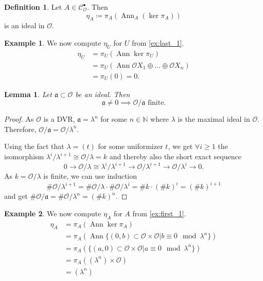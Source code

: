 \documentclass{article}
\theoremstyle{plain}%
\newtheorem{lemma}{Lemma}[section]
\theoremstyle{definition}
\newtheorem{definition}{Definition}[section]
\newtheorem{example}{Example}[section]
\theoremstyle{remark}
\newcommand{\cob}{\mathcal{C}_\mathcal{O}^\bullet}
\newcommand{\ann}{\operatorname{Ann}}
\begin{document}
    \begin{definition}
        Let \(A \in \cob\). Then
        \[\eta_A \coloneqq \pi_A(\ann_A (\ker \pi_A))\] is an ideal in \(\mathcal{O}\).
    \end{definition}

    \begin{example}
        We now compute \(\eta_U\) for \(U\) from \cref{ex:last_1}.
        \begin{align*}
            \eta_U &= \pi_U(\ann \ker \pi_U)\\
            &= \pi_U(\ann \mathcal{O}X_1 \oplus \dots \oplus \mathcal{O}X_n)\\
            &= \pi_U(0) = 0.
        \end{align*}
    \end{example}

    \begin{lemma}\label{lem:ideals}
        Let \(\mathfrak a \subset \mathcal{O}\) be an ideal. Then
        \[\mathfrak a \neq 0 \implies \mathcal{O}/\mathfrak a \text{ finite}.\]
    \end{lemma}
    \begin{proof}
        As \(\mathcal{O}\) is a DVR, \(\mathfrak a = \lambda^n\) for some \(n \in \mathbb N\) 
        where \(\lambda\) is the maximal ideal in \(\mathcal{O}\).
        Therefore, \(\mathcal{O}/\mathfrak{a} = \mathcal{O}/\lambda^n.\)

        Using the fact that \(\lambda = (t)\) for some uniformizer \(t\), we get \(\forall i \ge 1\) 
        the isomorphism \(\lambda^i/\lambda^{i+1} \cong \mathcal{O}/\lambda = k\) and thereby also the short exact sequence 
        \[0 \to \mathcal{O}/\lambda \cong \lambda^i/\lambda^{i+1} \to \mathcal{O}/\lambda^{i+1} \to \mathcal{O}/\lambda^{i} \to 0.\]
        As \(k = \mathcal{O}/\lambda\) is finite, we can use induction
        \[\# \mathcal{O}/\lambda^{i+1} = \# \mathcal{O}/\lambda \cdot \# \mathcal{O}/\lambda^i = \# k \cdot (\# k)^i = (\# k)^{i+1}\]
        and get \(\# \mathcal{O}/\mathfrak{a} = \# \mathcal{O}/\lambda^n = (\# k)^n\).
    \end{proof}

    \begin{example}\label{ex:first_eta}
        We now compute \(\eta_A\) for \(A\) from \cref{ex:first_1}.
        \begin{align*}
            \eta_A &= \pi_A(\ann \ker \pi_A)\\
            &= \pi_A(\ann \{(0, b) \subset \mathcal{O}\times \mathcal{O} | b \equiv 0 \mod \lambda^n\})\\
            &= \pi_A(\{(a, 0) \subset \mathcal{O}\times \mathcal{O} | a \equiv 0 \mod \lambda^n\})\\
            &= \pi_A((\lambda^n) \times \mathcal{O})\\
            &= (\lambda^n)
        \end{align*}
    \end{example}
\end{document}

